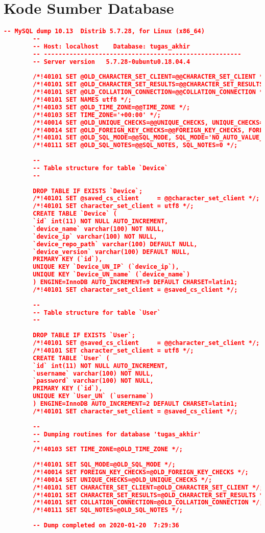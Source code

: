 	\section*{Kode Sumber Database}
		\begin{lstlisting}[frame=single,tabsize=2,breaklines,caption={Kode Sumber Database},label=database, captionpos=b, language=json]
		-- MySQL dump 10.13  Distrib 5.7.28, for Linux (x86_64)
		--
		-- Host: localhost    Database: tugas_akhir
		-- ------------------------------------------------------
		-- Server version	5.7.28-0ubuntu0.18.04.4
		
		/*!40101 SET @OLD_CHARACTER_SET_CLIENT=@@CHARACTER_SET_CLIENT */;
		/*!40101 SET @OLD_CHARACTER_SET_RESULTS=@@CHARACTER_SET_RESULTS */;
		/*!40101 SET @OLD_COLLATION_CONNECTION=@@COLLATION_CONNECTION */;
		/*!40101 SET NAMES utf8 */;
		/*!40103 SET @OLD_TIME_ZONE=@@TIME_ZONE */;
		/*!40103 SET TIME_ZONE='+00:00' */;
		/*!40014 SET @OLD_UNIQUE_CHECKS=@@UNIQUE_CHECKS, UNIQUE_CHECKS=0 */;
		/*!40014 SET @OLD_FOREIGN_KEY_CHECKS=@@FOREIGN_KEY_CHECKS, FOREIGN_KEY_CHECKS=0 */;
		/*!40101 SET @OLD_SQL_MODE=@@SQL_MODE, SQL_MODE='NO_AUTO_VALUE_ON_ZERO' */;
		/*!40111 SET @OLD_SQL_NOTES=@@SQL_NOTES, SQL_NOTES=0 */;
		
		--
		-- Table structure for table `Device`
		--
		
		DROP TABLE IF EXISTS `Device`;
		/*!40101 SET @saved_cs_client     = @@character_set_client */;
		/*!40101 SET character_set_client = utf8 */;
		CREATE TABLE `Device` (
		`id` int(11) NOT NULL AUTO_INCREMENT,
		`device_name` varchar(100) NOT NULL,
		`device_ip` varchar(100) NOT NULL,
		`device_repo_path` varchar(100) DEFAULT NULL,
		`device_version` varchar(100) DEFAULT NULL,
		PRIMARY KEY (`id`),
		UNIQUE KEY `Device_UN_IP` (`device_ip`),
		UNIQUE KEY `Device_UN_name` (`device_name`)
		) ENGINE=InnoDB AUTO_INCREMENT=9 DEFAULT CHARSET=latin1;
		/*!40101 SET character_set_client = @saved_cs_client */;
		
		--
		-- Table structure for table `User`
		--
		
		DROP TABLE IF EXISTS `User`;
		/*!40101 SET @saved_cs_client     = @@character_set_client */;
		/*!40101 SET character_set_client = utf8 */;
		CREATE TABLE `User` (
		`id` int(11) NOT NULL AUTO_INCREMENT,
		`username` varchar(100) NOT NULL,
		`password` varchar(100) NOT NULL,
		PRIMARY KEY (`id`),
		UNIQUE KEY `User_UN` (`username`)
		) ENGINE=InnoDB AUTO_INCREMENT=2 DEFAULT CHARSET=latin1;
		/*!40101 SET character_set_client = @saved_cs_client */;
		
		--
		-- Dumping routines for database 'tugas_akhir'
		--
		/*!40103 SET TIME_ZONE=@OLD_TIME_ZONE */;
		
		/*!40101 SET SQL_MODE=@OLD_SQL_MODE */;
		/*!40014 SET FOREIGN_KEY_CHECKS=@OLD_FOREIGN_KEY_CHECKS */;
		/*!40014 SET UNIQUE_CHECKS=@OLD_UNIQUE_CHECKS */;
		/*!40101 SET CHARACTER_SET_CLIENT=@OLD_CHARACTER_SET_CLIENT */;
		/*!40101 SET CHARACTER_SET_RESULTS=@OLD_CHARACTER_SET_RESULTS */;
		/*!40101 SET COLLATION_CONNECTION=@OLD_COLLATION_CONNECTION */;
		/*!40111 SET SQL_NOTES=@OLD_SQL_NOTES */;
		
		-- Dump completed on 2020-01-20  7:29:36
		\end{lstlisting}